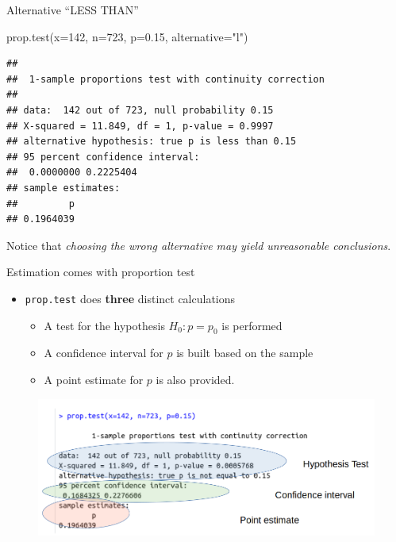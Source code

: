 \documentclass[
  ignorenonframetext,
]{beamer}
\newenvironment{Shaded}{\begin{snugshade}}{\end{snugshade}}
\newcommand{\AttributeTok}[1]{\textcolor[rgb]{0.77,0.63,0.00}{#1}}
\newcommand{\DecValTok}[1]{\textcolor[rgb]{0.00,0.00,0.81}{#1}}
\newcommand{\FloatTok}[1]{\textcolor[rgb]{0.00,0.00,0.81}{#1}}
\newcommand{\FunctionTok}[1]{\textcolor[rgb]{0.00,0.00,0.00}{#1}}
\newcommand{\NormalTok}[1]{#1}
\newcommand{\StringTok}[1]{\textcolor[rgb]{0.31,0.60,0.02}{#1}}
\providecommand{\tightlist}{%
  \setlength{\itemsep}{0pt}\setlength{\parskip}{0pt}}
\begin{document}
\begin{frame}[fragile]
Alternative ``LESS THAN''

\begin{Shaded}
\begin{Highlighting}[]
\FunctionTok{prop.test}\NormalTok{(}\AttributeTok{x=}\DecValTok{142}\NormalTok{, }\AttributeTok{n=}\DecValTok{723}\NormalTok{, }\AttributeTok{p=}\FloatTok{0.15}\NormalTok{, }\AttributeTok{alternative=}\StringTok{"l"}\NormalTok{)}
\end{Highlighting}
\end{Shaded}

\begin{verbatim}
## 
##  1-sample proportions test with continuity correction
## 
## data:  142 out of 723, null probability 0.15
## X-squared = 11.849, df = 1, p-value = 0.9997
## alternative hypothesis: true p is less than 0.15
## 95 percent confidence interval:
##  0.0000000 0.2225404
## sample estimates:
##         p 
## 0.1964039
\end{verbatim}

Notice that \emph{choosing the wrong alternative may yield unreasonable
conclusions}.
\end{frame}

\begin{frame}[fragile]{Estimation comes with proportion test}
\protect\hypertarget{estimation-comes-with-proportion-test}{}
\begin{itemize}
\item
  \texttt{prop.test} does \textbf{three} distinct calculations

  \begin{itemize}
  \tightlist
  \item
    A test for the hypothesis \(H_0: p=p_0\) is performed
  \item
    A confidence interval for \(p\) is built based on the sample
  \item
    A point estimate for \(p\) is also provided.
  \end{itemize}
\end{itemize}

\begin{figure}
\includegraphics[width=1\linewidth]{images/propTestsAndCI} \end{figure}
\end{frame}
\end{document}
